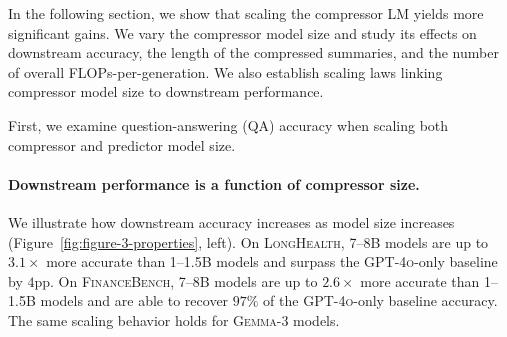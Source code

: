\documentclass{article} %
\begin{document}
In the following section, we show that scaling the compressor LM yields more significant gains. We vary the compressor model size and study its effects on downstream accuracy, the length of the compressed summaries, and the number of overall FLOPs-per-generation. We also establish scaling laws linking compressor model size to downstream performance.

First, we examine question-answering (QA) accuracy when scaling both compressor and predictor model size.


\paragraph*{Downstream performance is a function of compressor size.} 
We illustrate how downstream accuracy increases as model size increases (Figure~\ref{fig:figure-3-properties}, left).
On \textsc{LongHealth}, 7--8B models are up to \(3.1\times\) more accurate than 1--1.5B models and surpass the \textsc{GPT-4o}-only baseline by $4$pp. On \textsc{FinanceBench}, 7--8B models are up to \(2.6\times\) more accurate than 1--1.5B models and are able to recover \(97\%\) of the \textsc{GPT-4o}-only baseline accuracy. The same scaling behavior holds for \textsc{Gemma-3} models.
\end{document}
